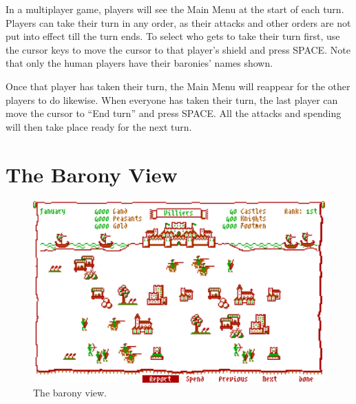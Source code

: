 \documentclass[8pt]{extarticle}
\begin{document}
\begin{multicols}{2}
\noindent
In a multiplayer game, players will see the Main Menu at the start of each turn. Players can take their turn in any order, as their attacks and other orders are not put into effect till the turn ends. To select who gets to take their turn first, use the cursor keys to move the cursor to that player's shield and press SPACE. Note that only the human players have their baronies' names shown.

Once that player has taken their turn, the Main Menu will reappear for the other players to do likewise. When everyone has taken their turn, the last player can move the cursor to ``End turn'' and press SPACE. All the attacks and spending will then take place ready for the next turn.
\end{multicols}

%
%

\pagebreak %
\section*{The Barony View}

\begin{figure}
  \centering
  \includegraphics[width=\textwidth]{barony}
  \caption*{The barony view.}
  \label{fig:title}
\end{figure}
\end{document}
